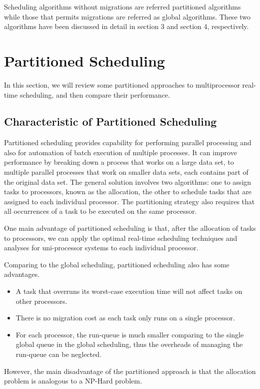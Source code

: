 \documentclass[preprint,12pt]{elsarticle}
\begin{document}
Scheduling algorithms without migrations are referred partitioned algorithms while those that permits migrations are referred as global algorithms. These two algorithms have been discussed in detail in section 3 and section 4, respectively.


\section{Partitioned Scheduling} \label{S:3}
In this section, we will review some partitioned approaches to multiprocessor real-time scheduling, and then compare their performance.
\subsection{Characteristic of Partitioned Scheduling}
Partitioned scheduling provides capability for performing parallel processing and also for automation of batch execution of multiple processes. It can improve performance by breaking down a process that works on a large data set, to multiple parallel processes that work on smaller data sets, each contains part of the original data set. The general solution involves two algorithms: one to assign tasks to processors, known as the allocation, the other to schedule tasks that are assigned to each individual processor. The partitioning strategy also requires that all occurrences of a task to be executed on the same processor.

One main advantage of partitioned scheduling is that, after the allocation of tasks to processors, we can apply the optimal real-time scheduling techniques and analyses for uni-processor systems to each individual processor. 

Comparing to the global scheduling, partitioned scheduling also has some advantages. 
\begin{itemize}
\item A task that overruns its worst-case execution time will not affect tasks on other processors.
\item There is no migration cost as each task only runs on a single processor.
\item For each processor, the run-queue is much smaller comparing to the single global queue in the global scheduling, thus the overheads of managing the run-queue can be neglected. 
\end{itemize}

However, the main disadvantage of the partitioned approach is that the allocation problem is analogous to a NP-Hard problem. 
\end{document}
